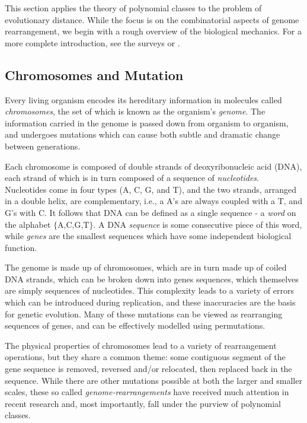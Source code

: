   This section applies the theory of polynomial classes to the problem of
  evolutionary distance. 
  While the focus is on the combinatorial aspects of genome
  rearrangement, we begin with a rough overview of the biological mechanics.
  For a more complete introduction, see the surveys \cite{CompBio} or
  \cite{GenomeBook}.
  

  \subsection{Chromosomes and Mutation}
      
    Every living organism encodes its hereditary information in molecules
    called \emph{chromosomes}, the set of which is known as the organism's
    \emph{genome}. The information carried in the genome is passed down from
    organism to organism, and undergoes mutations which can cause both subtle
    and dramatic change between generations. 
  
    Each chromosome is composed of double strands of deoxyribonucleic acid
    (DNA), each strand of which is in turn composed of a sequence of
    \emph{nucleotides}. Nucleotides come in four types (A, C, G, and T), and
    the two strands, arranged in a double helix, are complementary, i.e., a A's
    are always coupled with a T, and G's with C. It follows that DNA can be
    defined as a single sequence - a \emph{word} on the alphabet
    $\{\text{A,C,G,T}\}$. A DNA \emph{sequence} is some consecutive piece of
    this word, while \emph{genes} are the smallest sequences which have some
    independent biological function.
    
    The genome is made up of chromosomes, which are in turn made up of coiled
    DNA strands, which can be broken down into genes sequences, which
    themselves are simply sequences of nucleotides. This complexity leads to
    a variety of errors which can be introduced during replication, and these
    inaccuracies are the basis for genetic evolution. Many of these
    mutations can be viewed as rearranging sequences of genes, and can be
    effectively modelled using permutations. 

    The physical properties of chromosomes lead to a variety of rearrangement
    operations, but they share a common theme: some contiguous segment of the
    gene sequence is removed, reversed and/or relocated, then replaced back in
    the sequence. While there are other mutations possible at both the larger
    and smaller scales, these so called \emph{genome-rearrangements} have
    received much attention in recent research and, most importantly, fall
    under the purview of polynomial classes.



